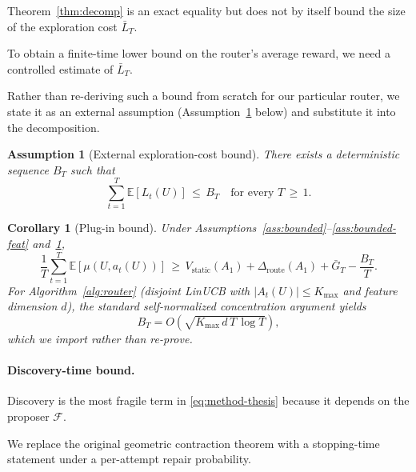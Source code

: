 \documentclass{article} %
\newtheorem{corollary}[theorem]{Corollary}
\newtheorem{assumption}{Assumption}
\providecommand{\E}{\mathbb{E}}
\begin{document}
\label{sec:method-plugin}

Theorem~\ref{thm:decomp} is an exact equality but does not by itself bound the size of the exploration cost $\bar L_T$.

To obtain a finite-time lower bound on the router's average reward, we need a controlled estimate of $\bar L_T$.

Rather than re-deriving such a bound from scratch for our particular router, we state it as an external assumption (Assumption~\ref{ass:Bt} below) and substitute it into the decomposition.

\begin{assumption}[External exploration-cost bound]
\label{ass:Bt}
There exists a deterministic sequence $B_T$ such that
\begin{equation}
\label{eq:ass-Bt}
\sum_{t=1}^T \E[L_t(U)] \,\le\, B_T \quad \text{for every } T \,\ge\, 1.
\end{equation}
\end{assumption}

\begin{corollary}[Plug-in bound]
\label{cor:plugin}
Under Assumptions~\ref{ass:bounded}--\ref{ass:bounded-feat} and~\ref{ass:Bt},
\begin{equation}
\label{eq:cor-plugin}
\frac{1}{T}\sum_{t=1}^T \E[\mu(U, a_t(U))]
\,\ge\, V_{\mathrm{static}}(A_1) + \Delta_{\mathrm{route}}(A_1) + \bar G_T - \frac{B_T}{T}.
\end{equation}
For Algorithm~\ref{alg:router} (disjoint LinUCB with $|A_t(U)| \le K_{\max}$ and feature dimension $d$), the standard self-normalized concentration argument \citep{abbasi2011oful,chu2011linucb} yields
\begin{equation}
\label{eq:cor-plugin-rate}
B_T = O\!\left(\sqrt{K_{\max} \, d \, T \, \log T}\right),
\end{equation}
which we import rather than re-prove.
\end{corollary}

\paragraph{Discovery-time bound.}

\label{sec:method-specialist}

Discovery is the most fragile term in \eqref{eq:method-thesis} because it depends on the proposer $\mathcal{F}$.

We replace the original geometric contraction theorem with a stopping-time statement under a per-attempt repair probability.
\end{document}
